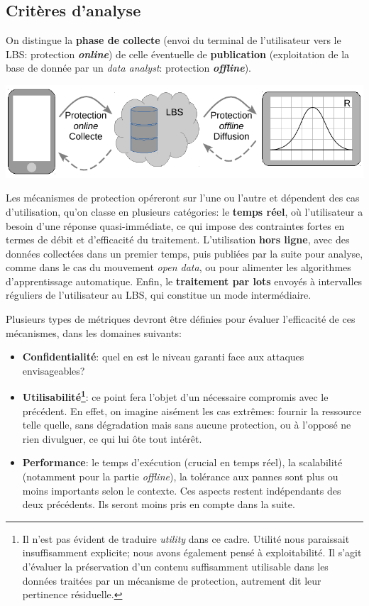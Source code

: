 \documentclass[a4paper,11pt]{article} %
\newcommand{\VESP}{\vspace*{0.8em}}
\begin{document}
\subsection{Critères d'analyse}
%
On distingue la \textbf{phase de collecte} (envoi du terminal de l'utilisateur vers le LBS: protection \emph{\textbf{online}}) de celle éventuelle de \textbf{publication} (exploitation de la base de donnée par un \emph{data analyst}: protection \emph{\textbf{offline}}).
\vspace{-0.3em}%
\begin{center}
    \includegraphics[scale=0.78]{Schema_phases.pdf}
\end{center} 
Les mécanismes de protection opéreront sur l'une ou l'autre et dépendent des cas d'utilisation, qu'on classe en plusieurs catégories: le \textbf{temps réel}, où l'utilisateur a besoin d'une réponse quasi-immédiate, ce qui impose des contraintes fortes en termes de débit et d'efficacité du traitement. 
L'utilisation \textbf{hors ligne}, avec des données collectées dans un premier temps, puis publiées par la suite pour analyse, comme dans le cas du mouvement \emph{open data}, ou pour alimenter les algorithmes d'apprentissage automatique. 
Enfin, le \textbf{traitement par lots} envoyés à intervalles réguliers de l'utilisateur au LBS, qui constitue un mode intermédiaire. 
\VESP

Plusieurs types de métriques devront être définies pour évaluer l'efficacité de ces mécanismes, dans les domaines suivants:\nopagebreak
\begin{itemize}
    \item 
    \textbf{Confidentialité}: quel en est le niveau garanti face aux attaques envisageables?
    \item %
    \textbf{Utilisabilité\footnote{Il n'est pas évident de traduire \og \emph{utility}\fg{} dans ce cadre. \og Utilité\fg{} nous paraissait insuffisamment explicite; nous avons également pensé à \og exploitabilité\fg{}. Il s'agit d'évaluer la préservation d'un contenu suffisamment utilisable dans les données traitées par un mécanisme de protection, autrement dit leur pertinence résiduelle.}}: ce point fera l'objet d'un nécessaire compromis avec le précédent. En effet, on imagine aisément les cas extrêmes: fournir la ressource telle quelle, sans dégradation mais sans aucune protection, ou à l'opposé ne rien divulguer, ce qui lui ôte tout intérêt.
    \item 
    \textbf{Performance}: le temps d'exécution (crucial en temps réel), la scalabilité (notamment pour la partie \emph{offline}), la tolérance aux pannes sont plus ou moins importants selon le contexte. Ces aspects restent indépendants des deux précédents. Ils seront moins pris en compte dans la suite.
    \end{itemize}
\end{document}
